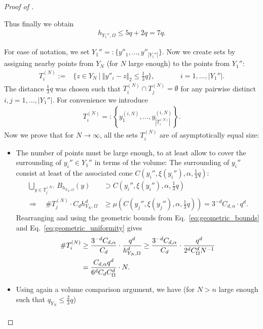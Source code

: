 \documentclass[a4paper, 10pt]{article}
\begin{document}
\begin{proof}[Proof of ]
\begin{itemize}
Thus finally we obtain
\begin{align*}
h_{Y_1'', \Omega} \leq 5q + 2q = 7q.
\end{align*}
\end{itemize}
For ease of notation, we set $Y_1'' =: \{y''_1, ..., y''_{|Y_1''|} \}$.
Now we create sets by assigning nearby points from $Y_N$ (for $N$ large enough) to the points from $Y_1''$:
\begin{align}
\label{eq:proof:definition_TiN}
T_i^{(N)} :=& \{ z \in Y_N ~ | ~ \Vert y''_i - z \Vert_2 \leq \frac{1}{3} q \}, \qquad &&i=1, ..., |Y_1''|.
\end{align}
The distance $\frac{1}{3}q$ was chosen such that $T_i^{(N)} \cap T_j^{(N)} = \emptyset$ for any pairwise distinct $i, j = 1, ..., |Y_1''|$. 
For convenience we introduce
\begin{align*}
T_i^{(N)} =: \left\{ y_1^{(i, N)}, ..., y_{|T_i^{(N)}|}^{(i, N)} \right\}.
\end{align*}
Now we prove that for $N \rightarrow \infty$, all the sets $T_i^{(N)}$ are of asymptotically equal size:
\begin{itemize}
\item The number of points must be large enough, to at least allow to cover the surrounding of $y_i'' \in Y_1''$ in terms of the volume:
The surrounding of $y_i''$ consist at least of the associated cone $C(y_i'', \xi(y_i''), \alpha, \frac{1}{3} q)$:
%
\begin{align*}
\bigcup_{y \in T_j^{(N)}} B_{h_{Y_N, \Omega}}(y) &\supset C(y_i'', \xi(y_i''), \alpha, \frac{1}{3}q) \\
\Rightarrow \quad \#T_j^{(N)} \cdot C_d h_{Y_N, \Omega}^{d} &\geq \mu(C(y_j'', \xi(y_j''), \alpha, \frac{1}{3}q)) = 3^{-d} C_{d, \alpha} \cdot q^d.
\end{align*}
Rearranging and using the geometric bounds from Eq.\ \eqref{eq:geometric_bounds} and Eq.\ \eqref{eq:geometric_uniformity} gives
\begin{align}
\label{eq:subset_size_lower_bound}
\# T_i^{(N)} &\geq \frac{3^{-d} C_{d, \alpha}}{C_d} \cdot \frac{q^d}{h_{Y_N, \Omega}^d}
\geq \frac{3^{-d} C_{d, \alpha}}{C_d} \cdot \frac{q^d}{2^d C_\Omega^d N^{-1}} \notag \\
&= \frac{C_{d, \alpha} q^d}{6^d C_d C_\Omega^d} \cdot N.
\end{align}
\item Using again a volume comparison argument, we have (for $N > n$ large enough such that $q_{Y_N} \leq \frac{2}{3} q$)
\begin{align*}

\end{align*}
\end{itemize}
\end{proof}
\end{document}
